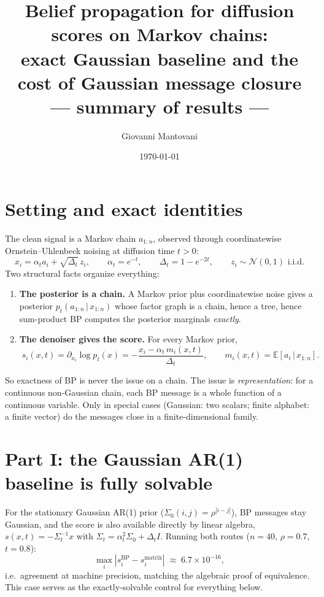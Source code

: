\documentclass[11pt]{article}
\title{Belief propagation for diffusion scores on Markov chains:\\
\large exact Gaussian baseline and the cost of Gaussian message closure\\
\normalsize --- summary of results ---}
\author{Giovanni Mantovani}
\date{\today}
\newcommand{\E}{\mathbb{E}}
\newcommand{\N}{\mathcal{N}}
\newcommand{\given}{\,|\,}
\begin{document}
\maketitle

\section{Setting and exact identities}

The clean signal is a Markov chain $a_{1:n}$, observed through coordinatewise
Ornstein--Uhlenbeck noising at diffusion time $t>0$:
\[
  x_i = \alpha_t a_i + \sqrt{\Delta_t}\, z_i,
  \qquad
  \alpha_t = e^{-t},
  \qquad
  \Delta_t = 1 - e^{-2t},
  \qquad z_i \sim \N(0,1) \text{ i.i.d.}
\]
Two structural facts organize everything:
\begin{enumerate}
  \item \textbf{The posterior is a chain.} A Markov prior plus coordinatewise noise
  gives a posterior $p_t(a_{1:n}\given x_{1:n})$ whose factor graph is a chain, hence a
  tree, hence sum-product BP computes the posterior marginals \emph{exactly}.
  \item \textbf{The denoiser gives the score.} For every Markov prior,
  \[
    \boxed{\;
    s_i(x,t) = \partial_{x_i} \log p_t(x)
             = -\frac{x_i - \alpha_t\, m_i(x,t)}{\Delta_t},
    \qquad
    m_i(x,t) = \E[a_i \given x_{1:n}].
    \;}
  \]
\end{enumerate}
So exactness of BP is never the issue on a chain. The issue is
\emph{representation}: for a continuous non-Gaussian chain, each BP message is a whole
function of a continuous variable. Only in special cases (Gaussian: two scalars;
finite alphabet: a finite vector) do the messages close in a finite-dimensional family.

\section{Part I: the Gaussian AR(1) baseline is fully solvable}

For the stationary Gaussian AR(1) prior ($\Sigma_0(i,j)=\rho^{|i-j|}$), BP messages stay
Gaussian, and the score is also available directly by linear algebra,
$s(x,t) = -\Sigma_t^{-1}x$ with $\Sigma_t = \alpha_t^2 \Sigma_0 + \Delta_t I$.
Running both routes ($n=40$, $\rho=0.7$, $t=0.8$):
\[
  \max_i \left| s^{\mathrm{BP}}_i - s^{\mathrm{matrix}}_i \right|
  \;\approx\; 6.7\times 10^{-16},
\]
i.e.\ agreement at machine precision, matching the algebraic proof of equivalence.
This case serves as the exactly-solvable control for everything below.
\end{document}
